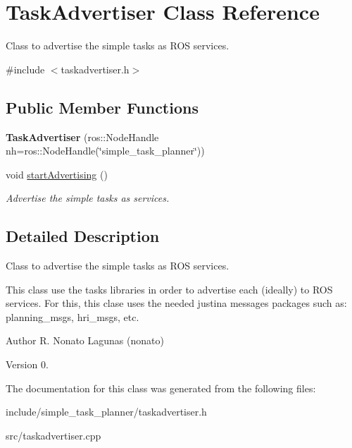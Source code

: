 \hypertarget{class_task_advertiser}{}\section{Task\+Advertiser Class Reference}
\label{class_task_advertiser}


Class to advertise the simple tasks as R\+OS services.  




{\ttfamily \#include $<$taskadvertiser.\+h$>$}

\subsection*{Public Member Functions}
\begin{DoxyCompactItemize}
\item 
{\bfseries Task\+Advertiser} (ros\+::\+Node\+Handle nh=ros\+::\+Node\+Handle(\char`\"{}simple\+\_\+task\+\_\+planner\char`\"{}))\hypertarget{class_task_advertiser_a55b983d7a922d0903a80d070f7b520c5}{}\label{class_task_advertiser_a55b983d7a922d0903a80d070f7b520c5}

\item 
void \hyperlink{class_task_advertiser_a23ee8ef6b343f52cd7b5d7d0dcbd6fe1}{start\+Advertising} ()\hypertarget{class_task_advertiser_a23ee8ef6b343f52cd7b5d7d0dcbd6fe1}{}\label{class_task_advertiser_a23ee8ef6b343f52cd7b5d7d0dcbd6fe1}

\begin{DoxyCompactList}\small\item\em Advertise the simple tasks as services. \end{DoxyCompactList}\end{DoxyCompactItemize}


\subsection{Detailed Description}
Class to advertise the simple tasks as R\+OS services. 

This class use the tasks libraries in order to advertise each (ideally) to R\+OS services. For this, this clase uses the needed justina messages packages such as\+: planning\+\_\+msgs, hri\+\_\+msgs, etc.

\begin{DoxyAuthor}{Author}
R. Nonato Lagunas (nonato) 
\end{DoxyAuthor}
\begin{DoxyVersion}{Version}
0. 
\end{DoxyVersion}


The documentation for this class was generated from the following files\+:\begin{DoxyCompactItemize}
\item 
include/simple\+\_\+task\+\_\+planner/taskadvertiser.\+h\item 
src/taskadvertiser.\+cpp\end{DoxyCompactItemize}
